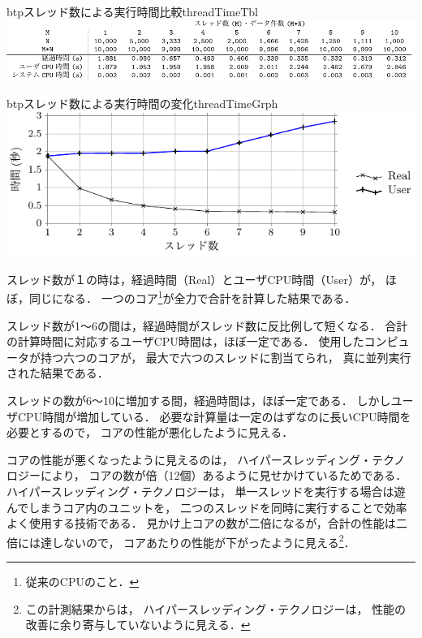 \begin{mytable}{btp}{スレッド数による実行時間比較}{threadTimeTbl}
\includegraphics[scale=0.9]{Tbl/threadTimeTbl.pdf}
\end{mytable}

\begin{myfig}{btp}{スレッド数による実行時間の変化}{threadTimeGrph}
\includegraphics[scale=1.0]{Tbl/threadTimeGrph.pdf}
\end{myfig}

スレッド数が１の時は，経過時間（Real）とユーザCPU時間（User）が，
ほぼ，同じになる．
一つのコア\footnote{従来のCPUのこと．}が全力で合計を計算した結果である．

スレッド数が1〜6の間は，経過時間がスレッド数に反比例して短くなる．
合計の計算時間に対応するユーザCPU時間は，ほぼ一定である．
使用したコンピュータが持つ六つのコアが，
最大で六つのスレッドに割当てられ，
真に並列実行された結果である．

スレッドの数が6〜10に増加する間，経過時間は，ほぼ一定である．
しかしユーザCPU時間が増加している．
必要な計算量は一定のはずなのに長いCPU時間を必要とするので，
コアの性能が悪化したように見える．

コアの性能が悪くなったように見えるのは，
ハイパースレッディング・テクノロジー\cite{hyperThreading}により，
コアの数が倍（12個）あるように見せかけているためである．
ハイパースレッディング・テクノロジーは，
単一スレッドを実行する場合は遊んでしまうコア内のユニットを，
二つのスレッドを同時に実行することで効率よく使用する技術である．
見かけ上コアの数が二倍になるが，合計の性能は二倍には達しないので，
コアあたりの性能が下がったように見える\footnote{
この計測結果からは，
ハイパースレッディング・テクノロジーは，
性能の改善に余り寄与していないように見える．
}．


